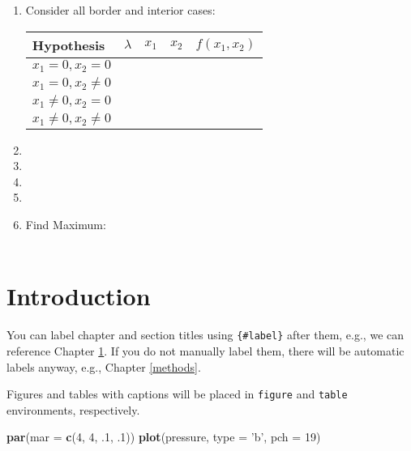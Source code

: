 \documentclass[]{book}
\newenvironment{Shaded}{\begin{snugshade}}{\end{snugshade}}
\newcommand{\KeywordTok}[1]{\textcolor[rgb]{0.13,0.29,0.53}{\textbf{#1}}}
\newcommand{\DataTypeTok}[1]{\textcolor[rgb]{0.13,0.29,0.53}{#1}}
\newcommand{\DecValTok}[1]{\textcolor[rgb]{0.00,0.00,0.81}{#1}}
\newcommand{\StringTok}[1]{\textcolor[rgb]{0.31,0.60,0.02}{#1}}
\newcommand{\NormalTok}[1]{#1}
\theoremstyle{definition}
\theoremstyle{definition}
\theoremstyle{definition}
\theoremstyle{remark}
\begin{document}
\begin{enumerate}
\item Consider all border and interior cases:
\begin{center}
\begin{tabular}{|l|ccc|c|}
\hline
Hypothesis  & $\lambda$& $x_1$ & $x_2$ & $f(x_1, x_2)$\\
\hline
$x_1 = 0, x_2 = 0$  &\multicolumn{3}{l|}{\phantom{No Solution}}& \\
$x_1 = 0, x_2 \neq 0$  &\multicolumn{3}{l|}{\phantom{No Solution}}& \\
$x_1 \neq 0, x_2 = 0$  & \multicolumn{3}{l|}{\phantom{No Solution}}& \\
$x_1 \neq 0, x_2 \neq 0$ &  & \phantom{$\frac{4}{3}$} & \phantom{$\frac{4}{3}$} & \phantom{$\log\frac{7}{3}$}\\
\hline
\end{tabular}
\end{center}

\item[]
\item[]
\item[]
\item[]

\item  Find Maximum:\\
\\
\end{enumerate}

\chapter{Introduction}\label{intro}

You can label chapter and section titles using \texttt{\{\#label\}}
after them, e.g., we can reference Chapter \ref{intro}. If you do not
manually label them, there will be automatic labels anyway, e.g.,
Chapter \ref{methods}.

Figures and tables with captions will be placed in \texttt{figure} and
\texttt{table} environments, respectively.

\begin{Shaded}
\begin{Highlighting}[]
\KeywordTok{par}\NormalTok{(}\DataTypeTok{mar =} \KeywordTok{c}\NormalTok{(}\DecValTok{4}\NormalTok{, }\DecValTok{4}\NormalTok{, .}\DecValTok{1}\NormalTok{, .}\DecValTok{1}\NormalTok{))}
\KeywordTok{plot}\NormalTok{(pressure, }\DataTypeTok{type =} \StringTok{'b'}\NormalTok{, }\DataTypeTok{pch =} \DecValTok{19}\NormalTok{)}
\end{Highlighting}
\end{Shaded}
\end{document}
